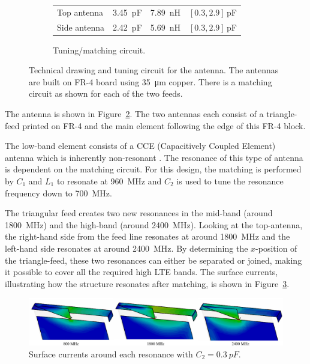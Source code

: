\begin{figure}[htbp]
\begin{subfigure}[b]{0.49\linewidth}
\begin{tabular}{|l|l|l|l|}
            \hline
            Top antenna & \SI{3.45}{pF} & \SI{7.89}{nH} & $[0.3,2.9]\,$pF\\
            Side antenna & \SI{2.42}{pF} & \SI{5.69}{nH} & $[0.3,2.9]\,$pF\\
            \hline
        \end{tabular}
        \caption{Tuning/matching circuit.}
        \label{fig:ant2schematic}
    \end{subfigure}
    \caption{Technical drawing and tuning circuit for the antenna.  The antennas are built on FR-4 board using \SI{35}{\micro\meter} copper. There is a matching circuit as shown for each of the two feeds.}
    \label{fig:ant2techschem}
\end{figure}

The antenna is shown in Figure~\ref{fig:ant2techschem}. The two antennas each consist of a triangle-feed printed on FR-4 and the main element following the edge of this FR-4 block.

The low-band element consists of a CCE (Capacitively Coupled Element) antenna which is inherently non-resonant \cite{valkonen2013inherently,ilvonen2014design}. The resonance of this type of antenna is dependent on the matching circuit. For this design, the matching is performed by $C_1$ and $L_1$ to resonate at \SI{960}{MHz} and $C_2$ is used to tune the resonance frequency down to \SI{700}{MHz}.

The triangular feed creates two new resonances in the mid-band (around \SI{1800}{MHz}) and the high-band (around \SI{2400}{MHz}). Looking at the top-antenna, the right-hand side from the feed line resonates at around \SI{1800}{MHz} and the left-hand side resonates at around \SI{2400}{MHz}. By determining the $x$-position of the triangle-feed, these two resonances can either be separated or joined, making it possible to cover all the required high LTE bands. The surface currents, illustrating how the structure resonates after matching, is shown in Figure~\ref{fig:ant2surfaces}.

\begin{figure}[htbp]
    \centering
    \includegraphics{img/tech_sol/trianglefeed/surface_currents}
    \caption{Surface currents around each resonance with $C_2=\SI{0.3}{pF}$.}
    \label{fig:ant2surfaces}
\end{figure}

